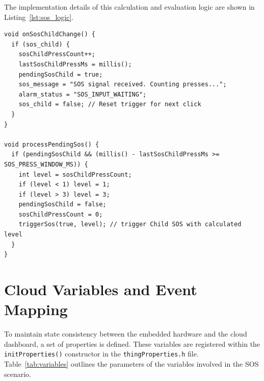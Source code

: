 \documentclass[conference]{IEEEtran}
\begin{document}
The implementation details of this calculation and evaluation logic are shown in Listing~\ref{lst:sos_logic}.

\begin{lstlisting}[caption={ESP32-CAM firmware logic for SOS press counting and level assignment.},label={lst:sos_logic}]
void onSosChildChange() {
  if (sos_child) {
    sosChildPressCount++;
    lastSosChildPressMs = millis();
    pendingSosChild = true;
    sos_message = "SOS signal received. Counting presses...";
    alarm_status = "SOS_INPUT_WAITING";
    sos_child = false; // Reset trigger for next click
  }
}

void processPendingSos() {
  if (pendingSosChild && (millis() - lastSosChildPressMs >= SOS_PRESS_WINDOW_MS)) {
    int level = sosChildPressCount;
    if (level < 1) level = 1;
    if (level > 3) level = 3;
    pendingSosChild = false;
    sosChildPressCount = 0;
    triggerSos(true, level); // trigger Child SOS with calculated level
  }
}
\end{lstlisting}

\section{Cloud Variables and Event Mapping}
To maintain state consistency between the embedded hardware and the cloud dashboard, a set of properties is defined. These variables are registered within the \texttt{initProperties()} constructor in the \texttt{thingProperties.h} file. Table~\ref{tab:variables} outlines the parameters of the variables involved in the SOS scenario.
\end{document}
